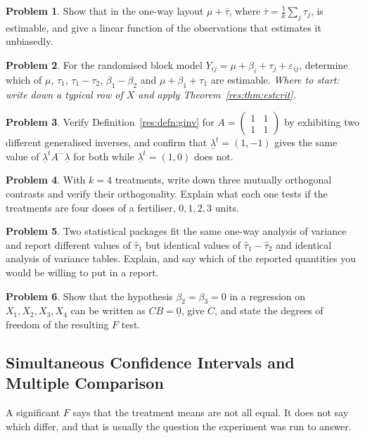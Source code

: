 \documentclass[11pt,a4paper]{article}
\theoremstyle{definition}
\newtheorem{problemx}{Problem}[section]
\newenvironment{problem}{\begin{problemx}}{\end{problemx}}
\begin{document}
\begin{problem}
Show that in the one-way layout $\mu+\overline{\tau}$, where
$\overline{\tau}=\tfrac{1}{k}\sum_j\tau_j$, is estimable, and give a linear
function of the observations that estimates it unbiasedly.
\end{problem}

\begin{problem}
For the randomised block model $Y_{ij}=\mu+\beta_i+\tau_j+\varepsilon_{ij}$,
determine which of $\mu$, $\tau_1$, $\tau_1-\tau_2$, $\beta_1-\beta_2$ and
$\mu+\beta_1+\tau_1$ are estimable.
\emph{Where to start: write down a typical row of $X$ and apply
Theorem~\ref{res:thm:estcrit}.}
\end{problem}

\begin{problem}
Verify Definition~\ref{res:defn:ginv} for
$A=\begin{pmatrix}1&1\\1&1\end{pmatrix}$ by exhibiting two different
generalised inverses, and confirm that $\underline{\lambda}^t=(1,-1)$ gives
the same value of $\underline{\lambda}^tA^{-}\underline{\lambda}$ for both
while $\underline{\lambda}^t=(1,0)$ does not.
\end{problem}

\begin{problem}
With $k=4$ treatments, write down three mutually orthogonal contrasts and
verify their orthogonality. Explain what each one tests if the treatments are
four doses of a fertiliser, $0,1,2,3$ units.
\end{problem}

\begin{problem}
Two statistical packages fit the same one-way analysis of variance and report
different values of $\widehat{\tau}_1$ but identical values of
$\widehat{\tau}_1-\widehat{\tau}_2$ and identical analysis of variance tables.
Explain, and say which of the reported quantities you would be willing to put
in a report.
\end{problem}

\begin{problem}
Show that the hypothesis $\beta_2=\beta_3=0$ in a regression on
$X_1,X_2,X_3,X_4$ can be written as $CB=\underline{0}$, give $C$, and state
the degrees of freedom of the resulting $F$ test.
\end{problem}

\newpage
\subsection{Simultaneous Confidence Intervals and Multiple Comparison}
A significant $F$ says that the treatment means are not all equal. It does not
say which differ, and that is usually the question the experiment was run to
answer.
\end{document}
